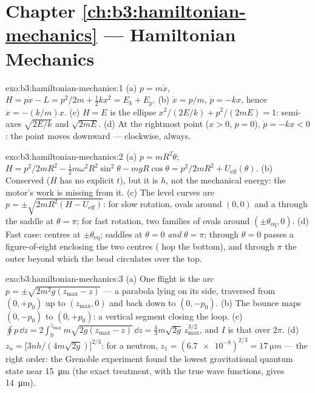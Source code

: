 \section*{Chapter \ref{ch:b3:hamiltonian-mechanics} --- Hamiltonian Mechanics}

\begin{solution}{exo:b3:hamiltonian-mechanics:1}
(a) $p = m\dot x$, $H = p\dot x - L = p^2/2m + \tfrac12 kx^2 = E_k +
E_p$. (b) $\dot x = p/m$, $\dot p = -kx$, hence $\ddot x = -(k/m)x$.
(c) $H = E$ is the ellipse $x^2/(2E/k) + p^2/(2mE) = 1$: semi-axes
$\sqrt{2E/k}$ and $\sqrt{2mE}$. (d) At the rightmost point ($x > 0$,
$p = 0$), $\dot p = -kx < 0$: the point moves downward --- clockwise,
always.
\end{solution}

\begin{solution}{exo:b3:hamiltonian-mechanics:2}
(a) $p = mR^2\dot\theta$; $H = p^2/2mR^2 - \tfrac12 m\omega^2R^2
\sin^2\theta - mgR\cos\theta = p^2/2mR^2 + U_{\text{eff}}(\theta)$.
(b) Conserved ($H$ has no explicit $t$), but it is $h$, not the
mechanical energy: the motor's work is missing from it. (c) The level
curves are $p = \pm\sqrt{2mR^2(H - U_{\text{eff}})}$: for slow
rotation, ovals around $(0, 0)$ and a  through the saddle at
$\theta = \pi$; for fast rotation, two families of ovals around
$(\pm\theta_{\text{eq}}, 0)$. (d) Fast case: centres at
$\pm\theta_{\text{eq}}$; saddles at $\theta = 0$ \emph{and} $\theta =
\pi$; through $\theta = 0$ passes a figure-of-eight 
enclosing the two centres ( hop the bottom), and
through $\pi$ the outer  beyond which the bead circulates
over the top.
\end{solution}

\begin{solution}{exo:b3:hamiltonian-mechanics:3}
(a) One flight is the arc $p = \pm\sqrt{2m^2g(z_{\max} - z)}$ --- a
parabola lying on its side, traversed from $(0, +p_0)$ up to
$(z_{\max}, 0)$ and back down to $(0, -p_0)$. (b) The bounce maps
$(0, -p_0)$ to $(0, +p_0)$: a vertical segment closing the loop. (c)
$\oint p\,\dd z = 2\int_0^{z_{\max}}m\sqrt{2g(z_{\max} - z)}\,\dd z =
\tfrac43 m\sqrt{2g}\,z_{\max}^{3/2}$, and $I$ is that over $2\pi$. (d)
$z_n = \big[3nh/(4m\sqrt{2g})\big]^{2/3}$: for a neutron, $z_1 =
(\num{6.7e-8})^{2/3} = \qty{17}{\micro m}$ --- the right order: the
Grenoble experiment found the lowest gravitational quantum state near
\qty{15}{\micro m} (the exact treatment, with the true wave functions,
gives \qty{14}{\micro m}).
\end{solution}


